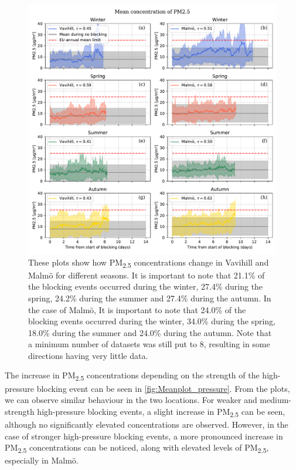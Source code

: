 \begin{figure}[H]
    \centering
    \includegraphics[width=\textwidth]{Figures/Meanplot_seasonal.pdf}
    \caption{These plots show how PM\textsubscript{2.5} concentrations change in Vavihill and Malmö for different seasons. It is important to note that 21.1\% of the blocking events occurred during the winter, 27.4\% during the spring, 24.2\% during the summer and 27.4\% during the autumn. In the case of Malmö, It is important to note that 24.0\% of the blocking events occurred during the winter, 34.0\% during the spring, 18.0\% during the summer and 24.0\% during the autumn. Note that a minimum number of datasets was still put to 8, resulting in some directions having very little data.}
    \label{fig:Meanplot_seasonal}
\end{figure}

The increase in PM\textsubscript{2.5} concentrations depending on the strength of the high-pressure blocking event can be seen in \autoref{fig:Meanplot_pressure}. From the plots, we can observe similar behaviour in the two locations. For weaker and medium-strength high-pressure blocking events, a slight increase in PM\textsubscript{2.5} can be seen, although no significantly elevated concentrations are observed. However, in the case of stronger high-pressure blocking events, a more pronounced increase in PM\textsubscript{2.5} concentrations can be noticed, along with elevated levels of PM\textsubscript{2.5}, especially in Malmö.


